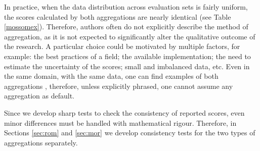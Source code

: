 \documentclass[3p, times]{elsarticle}
\begin{document}
In practice, when the data distribution across evaluation sets is fairly uniform, the scores calculated by both aggregations are nearly identical (see Table \ref{mossomex}). Therefore, authors often do not explicitly describe the method of aggregation, as it is not expected to significantly alter the qualitative outcome of the research. A particular choice could be motivated by multiple factors, for example: the best practices of a field; the available implementation; the need to estimate the uncertainty of the scores; small and imbalanced data, etc. Even in the same domain, with the same data, one can find examples of both aggregations \cite{vessel}, therefore, unless explicitly phrased, one cannot assume any aggregation as default.

Since we develop sharp tests to check the consistency of reported scores, even minor differences must be handled with mathematical rigour. Therefore, in Sections \ref{sec:rom} and \ref{sec:mor} we develop consistency tests for the two types of aggregations separately.
\end{document}
